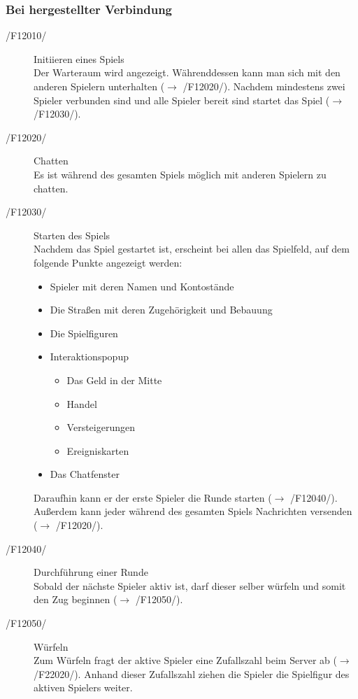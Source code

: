 \documentclass[a4paper,10pt]{article}
\begin{document}
\subsubsection{Bei hergestellter Verbindung}
\begin{description}
\item[/F12010/] Initiieren eines Spiels \\
Der Warteraum wird angezeigt. Währenddessen kann man sich mit den anderen Spielern unterhalten ($\rightarrow$ /F12020/). Nachdem mindestens zwei Spieler verbunden sind und alle Spieler bereit sind startet das Spiel ($\rightarrow$ /F12030/). 
\item[/F12020/] Chatten \\
Es ist während des gesamten Spiels möglich mit anderen Spielern zu chatten.
\item[/F12030/] Starten des Spiels \\
Nachdem das Spiel gestartet ist, erscheint bei allen das Spielfeld, auf dem folgende Punkte angezeigt werden:
\begin{itemize}
\item Spieler mit deren Namen und Kontostände
\item Die Straßen mit deren Zugehörigkeit und Bebauung
\item Die Spielfiguren
\item Interaktionspopup
\begin{itemize}
\item Das Geld in der Mitte
\item Handel
\item Versteigerungen
\item Ereigniskarten
\end{itemize}
\item Das Chatfenster
\end{itemize}
Daraufhin kann er der erste Spieler die Runde starten ($\rightarrow$ /F12040/). Außerdem kann jeder während des gesamten Spiels Nachrichten versenden ($\rightarrow$ /F12020/).
\item[/F12040/] Durchführung einer Runde \\
Sobald der nächste Spieler aktiv ist, darf dieser selber würfeln und somit den Zug beginnen ($\rightarrow$ /F12050/).
\item[/F12050/] Würfeln \\
Zum Würfeln fragt der aktive Spieler eine Zufallszahl beim Server ab ($\rightarrow$ /F22020/). Anhand dieser Zufallszahl ziehen die Spieler die Spielfigur des aktiven Spielers weiter.


\end{description}
\end{document}
